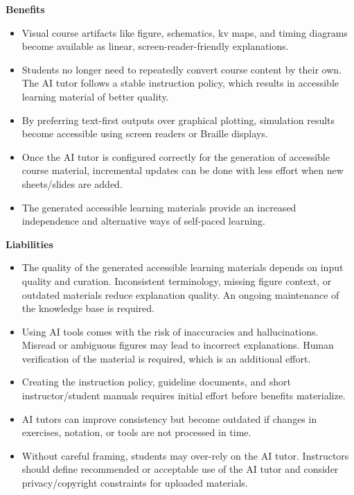 \noindent\textbf{Benefits}
\begin{itemize}
    \item[$+$] Visual course artifacts like figure, schematics, \ac{kv} maps, and timing diagrams become available as linear, screen-reader-friendly explanations.
    \item[$+$]  Students no longer need to repeatedly convert course content by their own. The AI tutor follows a stable instruction policy, which results in accessible learning material of better quality.
    \item[$+$] By preferring text-first outputs  over graphical plotting, simulation results become accessible using screen readers or Braille displays.
    \item[$+$]  Once the AI tutor is configured correctly for the generation of accessible course material, incremental updates can be done with less effort when new sheets/slides are added.
    \item[$+$] The generated accessible learning materials provide an increased independence and alternative ways of self-paced learning.
\end{itemize}

\noindent\textbf{Liabilities}
\begin{itemize}
    \item[$-$] The quality of the generated accessible learning materials  depends on input quality and curation. Inconsistent terminology, missing figure context, or outdated materials reduce explanation quality. An ongoing maintenance of the knowledge base is required.
    \item[$-$] Using AI tools comes with the risk of inaccuracies and hallucinations. Misread or ambiguous figures may lead to incorrect explanations. Human verification of the material is required, which is an additional effort.
    \item[$-$] Creating the instruction policy, guideline documents, and short instructor/student manuals requires initial effort before benefits materialize.
    \item[$-$]  AI tutors can improve consistency but  become outdated if changes in exercises, notation, or tools are not processed in time.
    \item[$-$] Without careful framing, students may over-rely on the AI tutor. Instructors should define recommended or acceptable use of the AI tutor and consider privacy/copyright constraints for uploaded materials.
\end{itemize}
